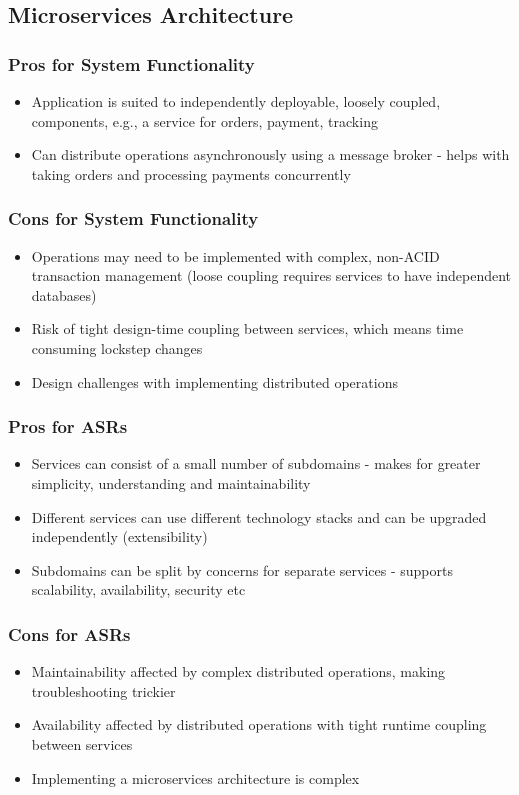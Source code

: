 \documentclass{article}
\begin{document}
\subsection{Microservices Architecture}
\subsubsection*{Pros for System Functionality}
\begin{itemize}
    \item Application is suited to independently deployable, loosely coupled, components, e.g., a service for orders, payment, tracking
    \item Can distribute operations asynchronously using a message broker - helps with taking orders and processing payments concurrently
\end{itemize}   
\subsubsection*{Cons for System Functionality}
\begin{itemize}
    \item Operations may need to be implemented with complex, non-ACID transaction management (loose coupling requires services to have independent databases)
    \item Risk of tight design-time coupling between services, which means time consuming lockstep changes
    \item Design challenges with implementing distributed operations
\end{itemize}

\subsubsection*{Pros for ASRs}
\begin{itemize}
    \item Services can consist of a small number of subdomains - makes for greater simplicity, understanding and maintainability
    \item Different services can use different technology stacks and can be upgraded independently (extensibility)
    \item Subdomains can be split by concerns for separate services - supports scalability, availability, security etc
\end{itemize}
\subsubsection*{Cons for ASRs}
\begin{itemize}
    \item Maintainability affected by complex distributed operations, making troubleshooting trickier
    \item Availability affected by distributed operations with tight runtime coupling between services
    \item Implementing a microservices architecture is complex
\end{itemize}
\end{document}
